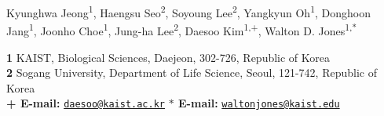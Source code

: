 Kyunghwa Jeong\textsuperscript{1},
Haengsu Seo\textsuperscript{2},
Soyoung Lee\textsuperscript{2},
Yangkyun Oh\textsuperscript{1},
Donghoon Jang\textsuperscript{1},
Joonho Choe\textsuperscript{1},
Jung-ha Lee\textsuperscript{2},
Daesoo Kim\textsuperscript{1,+},
Walton D. Jones\textsuperscript{1,*}

{\bf 1} KAIST, Biological Sciences, Daejeon, 302-726, Republic of Korea
\\
{\bf 2} Sogang University, Department of Life Science, Seoul, 121-742, Republic of Korea
\\
{\bf + E-mail:} \href{mailto:daesoo@kaist.ac.kr}{\nolinkurl{daesoo@kaist.ac.kr}}
{\bf $\ast$ E-mail:} \href{mailto:waltonjones@kaist.edu}{\nolinkurl{waltonjones@kaist.edu}}